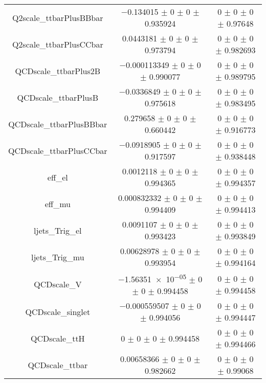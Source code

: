 \begin{table}
\begin{tabular}{ccc}
Q2scale\_ttbarPlusBBbar & \num{-0.134015} $\pm$ \num{0} $\pm$ \num{0} $\pm$ \num{0.935924} & \num{0} $\pm$ \num{0} $\pm$ \num{0} $\pm$ \num{0.97648}\\
Q2scale\_ttbarPlusCCbar & \num{0.0443181} $\pm$ \num{0} $\pm$ \num{0} $\pm$ \num{0.973794} & \num{0} $\pm$ \num{0} $\pm$ \num{0} $\pm$ \num{0.982693}\\
QCDscale\_ttbarPlus2B & \num{-0.000113349} $\pm$ \num{0} $\pm$ \num{0} $\pm$ \num{0.990077} & \num{0} $\pm$ \num{0} $\pm$ \num{0} $\pm$ \num{0.989795}\\
QCDscale\_ttbarPlusB & \num{-0.0336849} $\pm$ \num{0} $\pm$ \num{0} $\pm$ \num{0.975618} & \num{0} $\pm$ \num{0} $\pm$ \num{0} $\pm$ \num{0.983495}\\
QCDscale\_ttbarPlusBBbar & \num{0.279658} $\pm$ \num{0} $\pm$ \num{0} $\pm$ \num{0.660442} & \num{0} $\pm$ \num{0} $\pm$ \num{0} $\pm$ \num{0.916773}\\
QCDscale\_ttbarPlusCCbar & \num{-0.0918905} $\pm$ \num{0} $\pm$ \num{0} $\pm$ \num{0.917597} & \num{0} $\pm$ \num{0} $\pm$ \num{0} $\pm$ \num{0.938448}\\
eff\_el & \num{0.0012118} $\pm$ \num{0} $\pm$ \num{0} $\pm$ \num{0.994365} & \num{0} $\pm$ \num{0} $\pm$ \num{0} $\pm$ \num{0.994357}\\
eff\_mu & \num{0.000832332} $\pm$ \num{0} $\pm$ \num{0} $\pm$ \num{0.994409} & \num{0} $\pm$ \num{0} $\pm$ \num{0} $\pm$ \num{0.994413}\\
ljets\_Trig\_el & \num{0.0091107} $\pm$ \num{0} $\pm$ \num{0} $\pm$ \num{0.993423} & \num{0} $\pm$ \num{0} $\pm$ \num{0} $\pm$ \num{0.993849}\\
ljets\_Trig\_mu & \num{0.00628978} $\pm$ \num{0} $\pm$ \num{0} $\pm$ \num{0.993954} & \num{0} $\pm$ \num{0} $\pm$ \num{0} $\pm$ \num{0.994164}\\
QCDscale\_V & \num{-1.56351e-05} $\pm$ \num{0} $\pm$ \num{0} $\pm$ \num{0.994458} & \num{0} $\pm$ \num{0} $\pm$ \num{0} $\pm$ \num{0.994458}\\
QCDscale\_singlet & \num{-0.000559507} $\pm$ \num{0} $\pm$ \num{0} $\pm$ \num{0.994056} & \num{0} $\pm$ \num{0} $\pm$ \num{0} $\pm$ \num{0.994447}\\
QCDscale\_ttH & \num{0} $\pm$ \num{0} $\pm$ \num{0} $\pm$ \num{0.994458} & \num{0} $\pm$ \num{0} $\pm$ \num{0} $\pm$ \num{0.994466}\\
QCDscale\_ttbar & \num{0.00658366} $\pm$ \num{0} $\pm$ \num{0} $\pm$ \num{0.982662} & \num{0} $\pm$ \num{0} $\pm$ \num{0} $\pm$ \num{0.99068}\\

\end{tabular}
\end{table}

